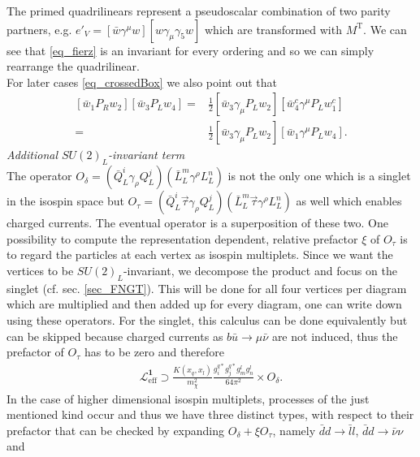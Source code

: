 The primed quadrilinears represent a pseudoscalar combination of two parity partners, e.g. $e'_V = \left[\bar w\gamma^\mu w\right]\left[w\gamma_\mu\gamma_5w\right]$
which are transformed with $M^\text{T}$. We can see that \eqref{eq_fierz} is an invariant for every ordering and so we can simply rearrange the quadrilinear.
\\ \noindent For later cases \eqref{eq_crossedBox} we also point out that 
\begin{subequations}
\begin{align}
 \left[\bar w_1 P_R w_2\right]\left[\bar w_3 P_L w_4\right] =& \frac12  \left[\bar w_3 \gamma_\mu P_L w_2\right]\left[\bar w^c_4 \gamma^\mu P_L w_1^c\right]\\
 =& \frac12  \left[\bar w_3 \gamma_\mu P_L w_2\right]\left[\bar w_1 \gamma^\mu P_L w_4\right].
 \label{eq_fierzSPtoVA}
\end{align} 
\end{subequations}
 \noindent \textit{Additional $SU(2)_L$-invariant term}\\
\noindent The operator $O_\delta=\left(\bar Q_L^i \gamma_\rho Q_L^j\right)\left(\bar L_L^m \gamma^\rho L_L^n\right)$ is not the only one which is a singlet
in the isospin space but $O_\tau=\left(\bar Q_L^i\vec \tau \gamma_\rho Q_L^j\right)\left(\bar L_L^m\vec \tau \gamma^\rho L_L^n\right)$ as well which enables
charged currents. The eventual operator is a superposition of these two. One possibility to compute the representation dependent, relative 
prefactor $\xi$ of $O_\tau$ is to regard the particles at each vertex as isospin multiplets. Since we want the vertices to be 
$SU(2)_L$-invariant, we 
decompose the product and focus on the singlet (cf. sec. \ref{sec_FNGT}). This will be done for all four vertices per diagram which are multiplied and then added up for every diagram,
one can write down using these operators. For the singlet, this calculus can be done equivalently but can be skipped because charged currents as 
$b \bar u \rightarrow \mu \bar \nu$ are not induced, thus the prefactor of $O_\tau$ has to be zero and therefore 
\begin{align}
  \mathcal{L}^{\textbf{1}}_\text{eff} \supset \frac{K(x_q,x_l)}{m_\chi^2}\frac{g_i^{q*} g_j^{q*} g_m^l g_n^l}{64\pi^2} \times O_\delta.
 \label{eq_LagBSmumuModA}
\end{align}
In the case of higher dimensional isospin multiplets, processes of the just mentioned kind occur and thus we have three distinct types, with respect to 
their prefactor that can be checked by expanding $O_\delta + \xi O_\tau$, namely $\bar d d\rightarrow \bar l l$, $\bar d d \rightarrow \bar\nu \nu$ and 
